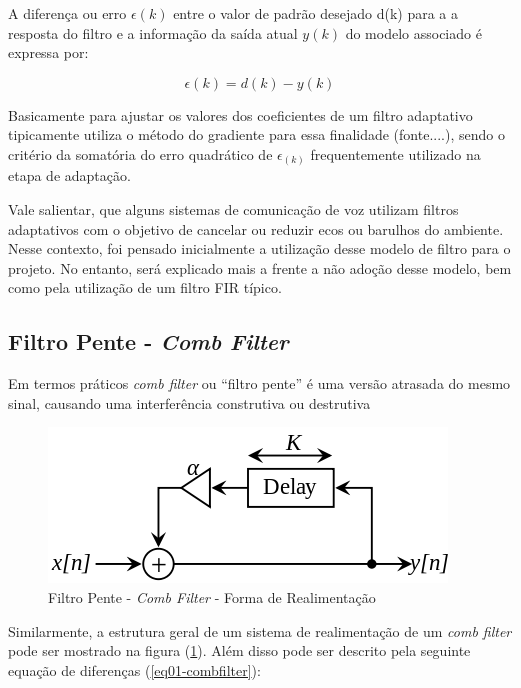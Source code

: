 		A diferença ou erro $\epsilon(k)$ entre o valor de padrão desejado d(k) para a a resposta do filtro e a informação da saída atual $y(k)$ do modelo associado é expressa por:
		
		\begin{equation}
			\label{eq2-filtroadap}
			\epsilon(k) = d(k)- y(k)
		\end{equation}
		
		Basicamente para ajustar os valores dos coeficientes de um filtro adaptativo tipicamente utiliza o método do gradiente para essa finalidade (fonte....), sendo o critério da somatória do erro quadrático de $\epsilon_(k)$ frequentemente utilizado na etapa de adaptação.
		
		Vale salientar, que alguns sistemas de comunicação de voz utilizam filtros adaptativos com o objetivo de cancelar ou reduzir ecos ou barulhos do ambiente. Nesse contexto, foi pensado inicialmente a utilização desse modelo de filtro para o projeto. No entanto, será explicado mais a frente a não adoção desse modelo, bem como pela utilização de um filtro FIR típico.
		
	\subsection{Filtro Pente - \textit{Comb Filter}}
		Em termos práticos \textit{comb filter} ou “filtro pente” é uma versão atrasada do mesmo sinal, causando uma  interferência construtiva ou destrutiva
		
		\begin{figure}[hbt]
			\centering
			\includegraphics[scale=0.5]{./figuras/Comb_filter_feedback.png}
			\caption{Filtro Pente - \textit{Comb Filter} - Forma de Realimentação}
			\label{fig01-combfilter}
		\end{figure}
		
		Similarmente, a estrutura geral de um sistema de realimentação de um \textit{comb filter} pode ser mostrado na figura (\ref{fig01-combfilter}). Além disso pode ser descrito pela seguinte equação de diferenças (\ref{eq01-combfilter}):
				
